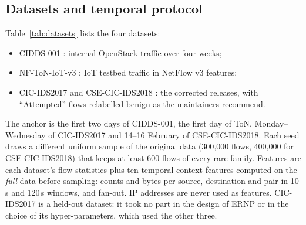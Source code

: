 \documentclass[a4paper,fleqn]{cas-dc}
\newcommand{\ERNP}{ERNP\xspace}
\begin{document}
\subsection{Datasets and temporal protocol}
Table~\ref{tab:datasets} lists the four datasets:
\begin{itemize}
  \item CIDDS-001 \cite{ring2017cidds}: internal OpenStack traffic over four weeks;
  \item NF-ToN-IoT-v3 \cite{moustafa2021toniot,luay2025netflowv3}: IoT testbed traffic in NetFlow v3 features;
  \item CIC-IDS2017 \cite{sharafaldin2018cicids,engelen2021troubleshooting} and CSE-CIC-IDS2018 \cite{liu2022error}: the corrected releases, with ``Attempted'' flows relabelled benign as the maintainers recommend.
\end{itemize}
The anchor is the first two days of CIDDS-001, the first day of ToN, Monday--Wednesday of CIC-IDS2017 and 14--16 February of CSE-CIC-IDS2018. Each seed draws a different uniform sample of the original data (300{,}000 flows, 400{,}000 for CSE-CIC-IDS2018) that keeps at least 600 flows of every rare family. Features are each dataset's flow statistics plus ten temporal-context features computed on the \emph{full} data before sampling: counts and bytes per source, destination and pair in 10\,s and 120\,s windows, and fan-out. IP addresses are never used as features. CIC-IDS2017 is a held-out dataset: it took no part in the design of \ERNP or in the choice of its hyper-parameters, which used the other three.

\begin{table}[t]
\centering
\caption{Datasets (seed-0 streams). Known families occur in the anchor; zero-day families first occur afterwards. $^\dagger$Not used during method development.}
\label{tab:datasets}
\scriptsize

\end{table}
\end{document}
